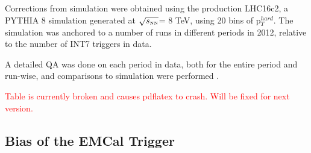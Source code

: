 \documentclass[ALICE]{ALICE_analysis_notes}
\newcommand{\sNN}{$\sqrt{s_{\mbox{\tiny NN}}}$\xspace}
\begin{document}
Corrections from simulation were obtained using the production LHC16c2, a PYTHIA 8 simulation generated at \sNN = 8 TeV, using 20 bins of p$_T^{hard}$. The simulation was anchored to a number of runs in different periods in 2012, relative to the number of INT7 triggers in data.

A detailed QA was done on each period in data, both for the entire period and run-wise, and comparisons to simulation were performed \cite{JIRATicket}.

\textcolor{red}{Table is currently broken and causes pdflatex to crash. Will be fixed for next version.}

\subsection{Bias of the EMCal Trigger}
\label{sec:EMCTriggerBias}
\end{document}
